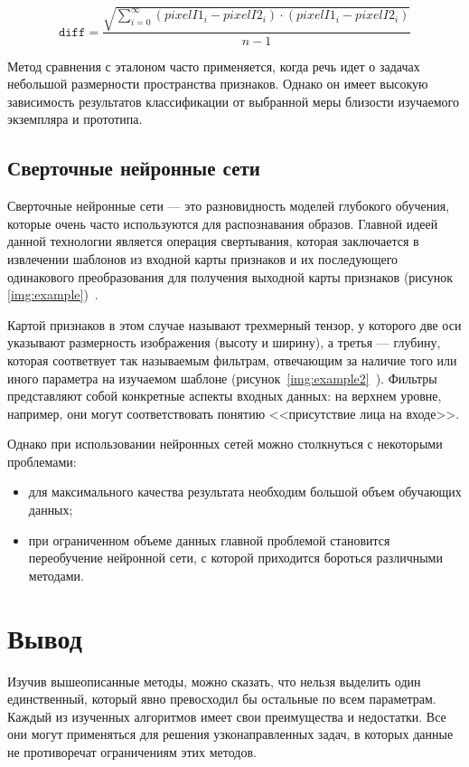 \begin{equation}
\label{eq:kvad_r}
    \texttt{diff} = \frac{\sqrt{\sum_{i=0}^\infty(pixelI1_i - pixelI2_i)\cdot(pixelI1_i - pixelI2_i)}}{n - 1}
\end{equation}


Метод сравнения с эталоном часто применяется, когда речь идет о задачах небольшой размерности пространства признаков. Однако он имеет высокую зависимость результатов классификации от выбранной меры близости изучаемого экземпляра и прототипа.

\subsection{Сверточные нейронные сети}
Сверточные нейронные сети --- это разновидность моделей глубокого обучения, которые очень часто используются для распознавания образов. Главной идеей данной технологии является операция свертывания, которая заключается в извлечении шаблонов из входной карты признаков и их последующего одинакового преобразования для получения выходной карты признаков (рисунок \ref{img:example})~\cite{deep_learning}.


Картой признаков в этом случае называют трехмерный тензор, у которого две оси указывают размерность изображения (высоту и ширину), а третья --- глубину, которая соответвует так называемым фильтрам, отвечающим за наличие того или иного параметра на изучаемом шаблоне (рисунок~\ref{img:example2}~\cite{deep_learning}). Фильтры представляют собой конкретные аспекты входных данных: на верхнем уровне, например, они могут соответствовать понятию <<присутствие лица на входе>>.

\FloatBarrier

Однако при использовании нейронных сетей можно столкнуться с некоторыми проблемами:
\begin{itemize}[label=---]
    \item для максимального качества результата необходим большой объем обучающих данных;
    \item при ограниченном объеме данных главной проблемой становится переобучение нейронной сети, с которой приходится бороться различными методами.
\end{itemize}

\section{Вывод}
Изучив вышеописанные методы, можно сказать, что нельзя выделить один единственный, который явно превосходил бы остальные по всем параметрам. Каждый из изученных алгоритмов имеет свои преимущества и недостатки. Все они могут применяться для решения узконаправленных задач, в которых данные не противоречат ограничениям этих методов.

